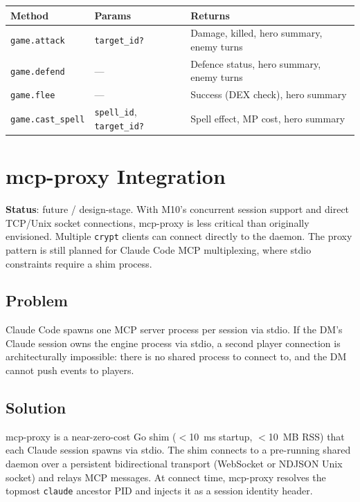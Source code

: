 \documentclass[a4paper,10pt]{article}
\newcommand{\cmd}[1]{\texttt{#1}}
\newcommand{\field}[1]{\texttt{#1}}
\begin{document}
\begin{center}
\begin{tabular}{lp{4cm}p{5cm}}
\toprule
\textbf{Method} & \textbf{Params} & \textbf{Returns} \\
\midrule
\texttt{game.attack}
  & \field{target\_id?}
  & Damage, killed, hero summary, enemy turns \\
\texttt{game.defend}
  & ---
  & Defence status, hero summary, enemy turns \\
\texttt{game.flee}
  & ---
  & Success (DEX check), hero summary \\
\texttt{game.cast\_spell}
  & \field{spell\_id}, \field{target\_id?}
  & Spell effect, MP cost, hero summary \\
\bottomrule
\end{tabular}
\end{center}

\section{mcp-proxy Integration}

\textbf{Status}: future / design-stage.  With M10's concurrent
session support and direct TCP/Unix socket connections, mcp-proxy is
less critical than originally envisioned.  Multiple \cmd{crypt}
clients can connect directly to the daemon.  The proxy pattern is
still planned for Claude Code MCP multiplexing, where stdio
constraints require a shim process.

\subsection{Problem}

Claude Code spawns one MCP server process per session via stdio.
If the DM's Claude session owns the engine process via stdio, a
second player connection is architecturally impossible: there is no
shared process to connect to, and the DM cannot push events to
players.

\subsection{Solution}

mcp-proxy is a near-zero-cost Go shim ($<$10~ms startup,
$<$10~MB RSS) that each Claude session spawns via stdio.  The shim
connects to a pre-running shared daemon over a persistent
bidirectional transport (WebSocket or NDJSON Unix socket) and
relays MCP messages.  At connect time, mcp-proxy resolves the
topmost \cmd{claude} ancestor PID and injects it as a session
identity header.
\end{document}
